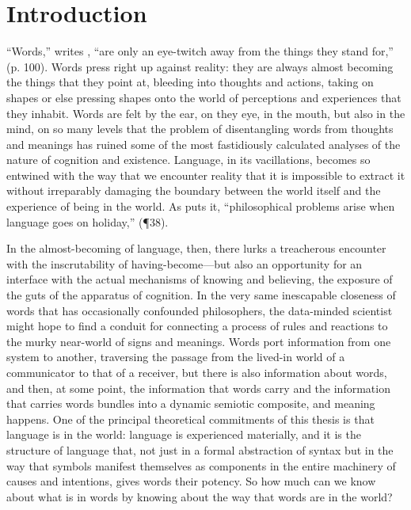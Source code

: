 \chapter{Introduction} \label{chap:intro}
``Words,'' writes \cite{Pynchon1973}, ``are only an eye-twitch away from the things they stand for,'' (p. 100).  Words press right up against reality: they are always almost becoming the things that they point at, bleeding into thoughts and actions, taking on shapes or else pressing shapes onto the world of perceptions and experiences that they inhabit.  Words are felt by the ear, on they eye, in the mouth, but also in the mind, on so many levels that the problem of disentangling words from thoughts and meanings has ruined some of the most fastidiously calculated analyses of the nature of cognition and existence.  Language, in its vacillations, becomes so entwined with the way that we encounter reality that it is impossible to extract it without irreparably damaging the boundary between the world itself and the experience of being in the world.  As \cite{Wittgenstein1953} puts it, ``philosophical problems arise when language goes on holiday,'' (\P 38).

In the almost-becoming of language, then, there lurks a treacherous encounter with the inscrutability of having-become---but also an opportunity for an interface with the actual mechanisms of knowing and believing, the exposure of the guts of the apparatus of cognition.  In the very same inescapable closeness of words that has occasionally confounded philosophers, the data-minded scientist might hope to find a conduit for connecting a process of rules and reactions to the murky near-world of signs and meanings.  Words port information from one system to another, traversing the passage from the lived-in world of a communicator to that of a receiver, but there is also information about words, and then, at some point, the information that words carry and the information that carries words bundles into a dynamic semiotic composite, and meaning happens.  One of the principal theoretical commitments of this thesis is that language is in the world: language is experienced materially, and it is the structure of language that, not just in a formal abstraction of syntax but in the way that symbols manifest themselves as components in the entire machinery of causes and intentions, gives words their potency.  So how much can we know about what is in words by knowing about the way that words are in the world?

